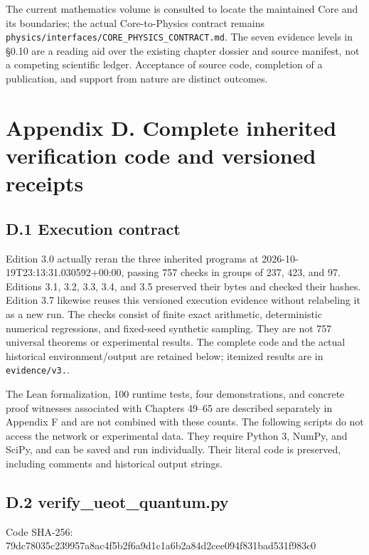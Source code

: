 \documentclass[
  11pt,
  oneside]{book}
\begin{document}
The current mathematics volume is consulted to locate the maintained
Core and its boundaries; the actual Core-to-Physics contract remains
\texttt{physics/\allowbreak interfaces/\allowbreak CORE\_\allowbreak PHYSICS\_\allowbreak CONTRACT.\allowbreak md}. The seven
evidence levels in §0.10 are a reading aid over the existing chapter
dossier and source manifest, not a competing scientific ledger.
Acceptance of source code, completion of a publication, and support from
nature are distinct outcomes.

\chapter{Appendix D. Complete inherited verification code and versioned
receipts}\label{appendix-d}

\section{D.1 Execution contract}

Edition 3.0 actually reran the three inherited programs at
2026-10-19T23:13:31.030592+00:00, passing 757 checks in groups of 237,
423, and 97. Editions 3.1, 3.2, 3.3, 3.4, and 3.5 preserved their bytes
and checked their hashes. Edition 3.7 likewise reuses this versioned
execution evidence without relabeling it as a new run. The checks
consist of finite exact arithmetic, deterministic numerical regressions,
and fixed-seed synthetic sampling. They are not 757 universal theorems
or experimental results. The complete code and the actual historical
environment/output are retained below; itemized results are in
\texttt{evidence/\allowbreak v3.}.

The Lean formalization, 100 runtime tests, four demonstrations, and
concrete proof witnesses associated with Chapters 49--65 are described
separately in Appendix F and are not combined with these counts. The
following scripts do not access the network or experimental data. They
require Python 3, NumPy, and SciPy, and can be saved and run
individually. Their literal code is preserved, including comments and
historical output strings.

\section{D.2 verify\_\allowbreak ueot\_\allowbreak quantum.py}

Code SHA-256:
79dc78035c239957\allowbreak a8ac4f5b2f6a9d1c\allowbreak 1a6b2a84d2cee094\allowbreak f831bad531f983c0
\end{document}
